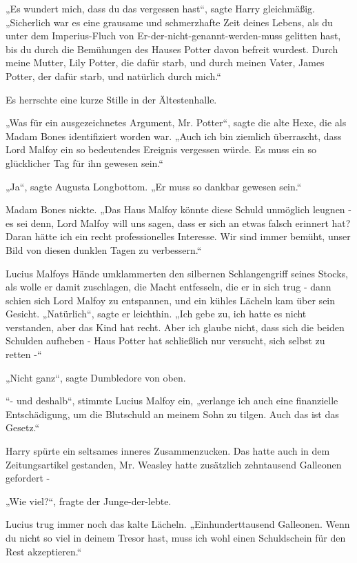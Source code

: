 {„Es wundert mich, dass du das vergessen hast“, sagte Harry gleichmäßig. „Sicherlich war es eine grausame und schmerzhafte Zeit deines Lebens, als du unter dem Imperius-Fluch von Er-der-nicht-genannt-werden-muss gelitten hast, bis du durch die Bemühungen des Hauses Potter davon befreit wurdest. Durch meine Mutter, Lily Potter, die dafür starb, und durch meinen Vater, James Potter, der dafür starb, und natürlich durch mich.“

Es herrschte eine kurze Stille in der Ältestenhalle.

„Was für ein ausgezeichnetes Argument, Mr. Potter“, sagte die alte Hexe, die als Madam Bones identifiziert worden war. „Auch ich bin ziemlich überrascht, dass Lord Malfoy ein so bedeutendes Ereignis vergessen würde. Es muss ein so glücklicher Tag für ihn gewesen sein.“

„Ja“, sagte Augusta Longbottom. „Er muss so dankbar gewesen sein.“

Madam Bones nickte. „Das Haus Malfoy könnte diese Schuld unmöglich leugnen - es sei denn, Lord Malfoy will uns sagen, dass er sich an etwas falsch erinnert hat? Daran hätte ich ein recht professionelles Interesse. Wir sind immer bemüht, unser Bild von diesen dunklen Tagen zu verbessern.“

Lucius Malfoys Hände umklammerten den silbernen Schlangengriff seines Stocks, als wolle er damit zuschlagen, die Macht entfesseln, die er in sich trug - dann schien sich Lord Malfoy zu entspannen, und ein kühles Lächeln kam über sein Gesicht. „Natürlich“, sagte er leichthin. „Ich gebe zu, ich hatte es nicht verstanden, aber das Kind hat recht. Aber ich glaube nicht, dass sich die beiden Schulden aufheben - Haus Potter hat schließlich nur versucht, sich selbst zu retten -“

„Nicht ganz“, sagte Dumbledore von oben.

“- und deshalb“, stimmte Lucius Malfoy ein, „verlange ich auch eine finanzielle Entschädigung, um die Blutschuld an meinem Sohn zu tilgen. Auch das ist das Gesetz.“

Harry spürte ein seltsames inneres Zusammenzucken. Das hatte auch in dem Zeitungsartikel gestanden, Mr. Weasley hatte zusätzlich zehntausend Galleonen gefordert -

„Wie viel?“, fragte der Junge-der-lebte.

Lucius trug immer noch das kalte Lächeln. „Einhunderttausend Galleonen. Wenn du nicht so viel in deinem Tresor hast, muss ich wohl einen Schuldschein für den Rest akzeptieren.“

}
